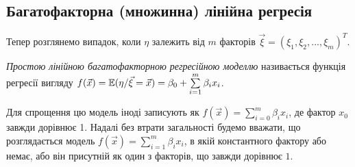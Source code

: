 \subsection{Багатофакторна (множинна) лінійна регресія}
Тепер розглянемо випадок, коли $\eta$ залежить від $m$ факторів $\vec{\xi} = \left(\xi_1, \xi_2, ..., \xi_m\right)^T$.
\begin{definition}
    \emph{Простою лінійною багатофакторною регресійною моделлю} називається функція регресії
    вигляду
    $
        f(\vec{x}) = \mathbb{E} (\eta / \vec{\xi} = \vec{x}) = \beta_0 + \sum\limits_{i=1}^m \beta_i x_i
    $.
\end{definition}
Для спрощення цю модель іноді записують як $f(\vec{x}) = \sum\limits_{i=0}^m \beta_i x_i$, де фактор $x_0$ завжди
дорівнює 1. Надалі без втрати загальності будемо вважати, що розглядається модель
$f(\vec{x}) = \sum\limits_{i=1}^m \beta_i x_i$, в якій константного фактору або немає, або він присутній як один з факторів,
що завжди дорівнює $1$.

